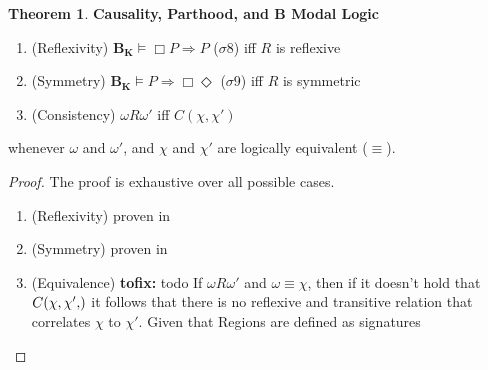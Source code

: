 \documentclass{article}
\newcommand{\fix}[2]{{\color{red} {\bf tofix:} #2}}
\theoremstyle{definition}
\theoremstyle{corollary}
\theoremstyle{lemma}
\theoremstyle{theorem}
\newtheorem{theorem}{Theorem}[section]
\theoremstyle{theorem}
\newcommand{\bframe}{\mathbf{B_K}}
\newcommand{\modalrelation}{R}
\newcommand{\world}{\omega}
\newcommand{\interpretation}{\sigma}
\newcommand{\region}{\chi}
\newcommand{\connects}[2]{C(#1,#2)}
\begin{document}
\begin{appendices}
	
\begin{theorem}{\bf Causality, Parthood, and B Modal Logic}\label{thm:bk-parthood}
	\begin{enumerate}[noitemsep]
		\item (Reflexivity) $\bframe\models\Box P\Rightarrow P$ ($\interpretation8$) iff $\modalrelation$ is reflexive
		\item (Symmetry) $\bframe\models P\Rightarrow\Box\Diamond$ ($\interpretation9$) iff $\modalrelation$ is symmetric
		\item (Consistency) $\world\modalrelation\world'$ iff $\connects{\region}{\region'}$
	\end{enumerate}
	whenever $\world$ and $\world'$, and $\region$ and $\region'$ are logically equivalent ($\equiv$).
\end{theorem}
\begin{proof}
	The proof is exhaustive over all possible cases.
	\begin{enumerate}[noitemsep]
		\item(Reflexivity) proven in\autocite{}
		\item(Symmetry) proven in\autocite{}
		\item(Equivalence) \fix{mr}{todo} If
			$\world\modalrelation\world'$ and
			$\world\equiv\region$, then if
			it doesn't hold that $\connects{\region,\region'}$ it
			follows that there is no reflexive and transitive
			relation that correlates $\region$ to $\region'$. Given 
			that Regions are defined as signatures
	\end{enumerate}
\end{proof}

\end{appendices}
\end{document}

